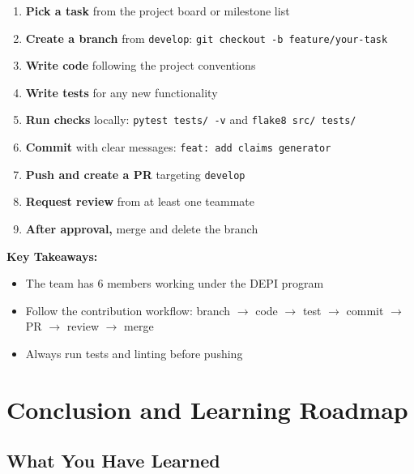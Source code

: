 \documentclass[12pt, a4paper, oneside]{report}
\begin{document}
\begin{enumerate}[label=\textcolor{primary}{\textbf{\arabic*.}}]
    \item \textbf{Pick a task} from the project board or milestone list
    \item \textbf{Create a branch} from \texttt{develop}: \texttt{git checkout -b feature/your-task}
    \item \textbf{Write code} following the project conventions
    \item \textbf{Write tests} for any new functionality
    \item \textbf{Run checks} locally: \texttt{pytest tests/ -v} and \texttt{flake8 src/ tests/}
    \item \textbf{Commit} with clear messages: \texttt{feat: add claims generator}
    \item \textbf{Push and create a PR} targeting \texttt{develop}
    \item \textbf{Request review} from at least one teammate
    \item \textbf{After approval,} merge and delete the branch
\end{enumerate}

\begin{summarybox}
\textbf{Key Takeaways:}
\begin{itemize}
    \item The team has 6 members working under the DEPI program
    \item Follow the contribution workflow: branch $\rightarrow$ code $\rightarrow$ test $\rightarrow$ commit $\rightarrow$ PR $\rightarrow$ review $\rightarrow$ merge
    \item Always run tests and linting before pushing
\end{itemize}
\end{summarybox}


\chapter{Conclusion and Learning Roadmap}
\label{ch:conclusion}

\section{What You Have Learned}
\end{document}
